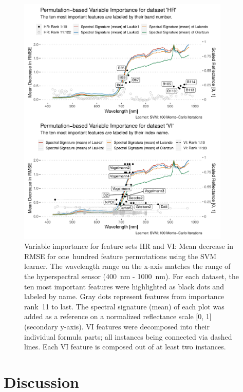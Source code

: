 \documentclass[remotesensing,article,submit,moreauthors,pdftex]{Definitions/mdpi}
\begin{document}
\begin{figure} [ht!]
	\centering
	\begin{center}
		\includegraphics[width=0.9\textwidth] {fi-permut-vi-hr-1.pdf}
		\caption{Variable importance for feature sets HR and VI: Mean decrease in RMSE for one\ hundred feature permutations using the SVM learner. The wavelength range on the x-axis matches the range of the hyperspectral sensor (400~nm - 1000~nm). For each dataset, the ten most important features were highlighted as black dots and labeled by name. Gray dots represent features from importance rank~11 to last. The spectral signature (mean) of each plot was added as a reference on a normalized reflectance scale [0, 1] (secondary y-axis). VI features were decomposed into their individual formula parts; all instances being connected via dashed lines. Each VI feature is composed out of at least two instances.}\label{fig:fi-permut-vi-hr}
	\end{center}
\end{figure}


\section{Discussion}
\end{document}
